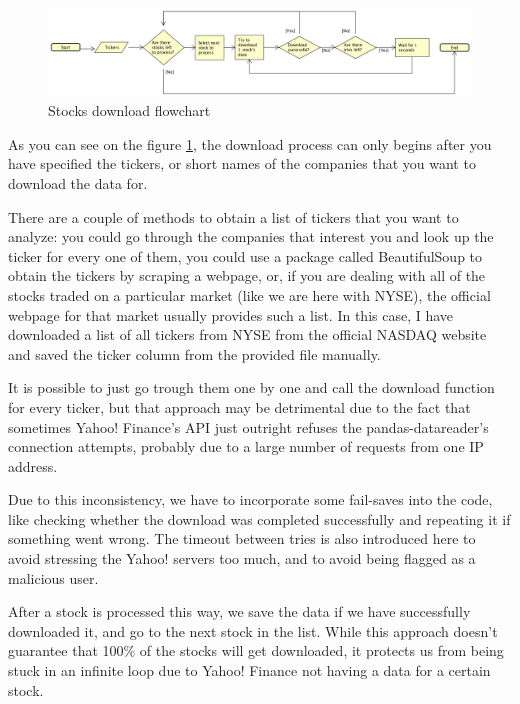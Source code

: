 \documentclass[12pt, a4paper]{article}
\begin{document}
\begin{figure}[H]
    \centering
    \includegraphics[width=\textwidth]{src/stocks/etl/stocks_download_chart}
    \caption{Stocks download flowchart}
    \label{fig:stocks_download_chart}
\end{figure}

As you can see on the figure \ref{fig:stocks_download_chart}, the download process can only begins after you have specified the tickers, or short names of the companies that you want to download the data for.

There are a couple of methods to obtain a list of tickers that you want to analyze: you could go through the companies that interest you and look up the ticker for every one of them, you could use a package called BeautifulSoup to obtain the tickers by scraping a webpage, or, if you are dealing with all of the stocks traded on a particular market (like we are here with NYSE), the official webpage for that market usually provides such a list. In this case, I have downloaded a list of all tickers from NYSE from the official NASDAQ website \cite{nasdaq_companylist} and saved the ticker column from the provided file  manually.

It is possible to just go trough them one by one and call the download function for every ticker, but that approach may be detrimental due to the fact that sometimes Yahoo! Finance’s API  just outright refuses the pandas-datareader’s connection attempts, probably due to a large number of requests from one IP address.

Due to this inconsistency, we have to incorporate some fail-saves into the code, like checking whether the download was completed successfully and repeating it if something went wrong. The timeout between tries is also introduced here to avoid stressing the Yahoo! servers too much, and to avoid being flagged as a malicious user.

After a stock is processed this way, we save the data if we have successfully downloaded it, and go to the next stock in the list. While this approach doesn’t guarantee that 100\% of the stocks will get downloaded, it protects us from being stuck in an infinite loop due to Yahoo! Finance not having a data for a certain stock.
\end{document}
